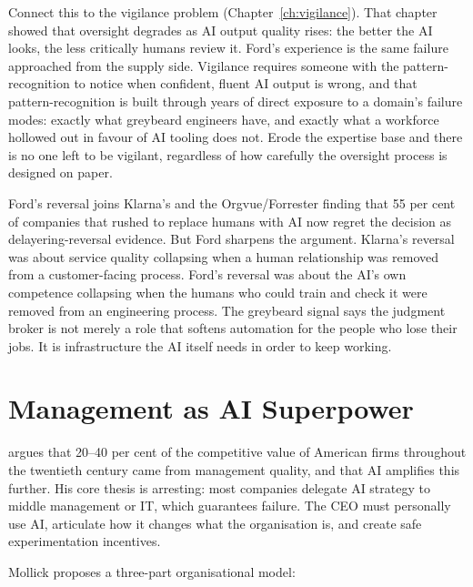 Connect this to the vigilance problem (Chapter~\ref{ch:vigilance}). That chapter showed that oversight degrades as AI output quality rises: the better the AI looks, the less critically humans review it. Ford's experience is the same failure approached from the supply side. Vigilance requires someone with the pattern-recognition to notice when confident, fluent AI output is wrong, and that pattern-recognition is built through years of direct exposure to a domain's failure modes: exactly what greybeard engineers have, and exactly what a workforce hollowed out in favour of AI tooling does not. Erode the expertise base and there is no one left to be vigilant, regardless of how carefully the oversight process is designed on paper.

Ford's reversal joins Klarna's \parencite{Klarna2025} and the Orgvue/Forrester finding that 55 per cent of companies that rushed to replace humans with AI now regret the decision \parencite{OrgvueForrester2025} as delayering-reversal evidence. But Ford sharpens the argument. Klarna's reversal was about service quality collapsing when a human relationship was removed from a customer-facing process. Ford's reversal was about the AI's own competence collapsing when the humans who could train and check it were removed from an engineering process. The greybeard signal says the judgment broker is not merely a role that softens automation for the people who lose their jobs. It is infrastructure the AI itself needs in order to keep working.

\section{Management as AI Superpower}

\textcite{Mollick2025Management} argues that 20--40 per cent of the competitive value of American firms throughout the twentieth century came from management quality, and that AI amplifies this further. His core thesis is arresting: most companies delegate AI strategy to middle management or IT, which guarantees failure. The CEO must personally use AI, articulate how it changes what the organisation is, and create safe experimentation incentives.

Mollick proposes a three-part organisational model:

